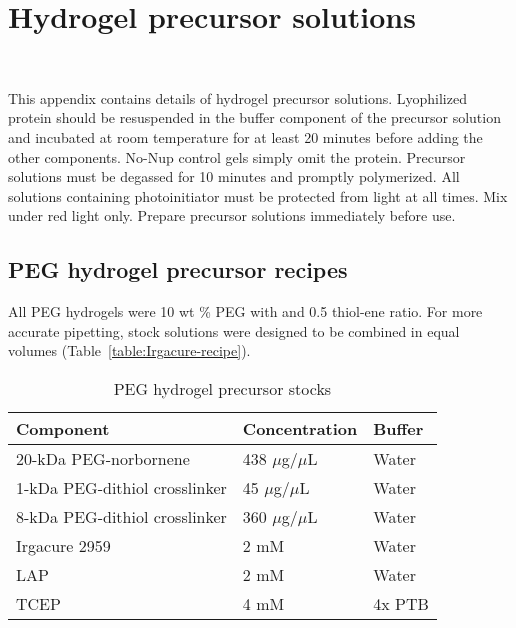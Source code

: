 \chapter{Hydrogel precursor solutions}~\label{appx:precursor-recipes}

This appendix contains details of hydrogel precursor solutions. Lyophilized protein should be resuspended in the buffer component of the precursor solution and incubated at room temperature for at least 20 minutes before adding the other components.  No-Nup control gels simply omit the protein.  Precursor solutions must be degassed for 10 minutes and promptly polymerized.  All solutions containing photoinitiator must be protected from light at all times.  Mix under red light only.  Prepare precursor solutions immediately before use.

\section{PEG hydrogel precursor recipes}

All PEG hydrogels were 10 wt \% PEG with and 0.5 thiol-ene ratio.  For more accurate pipetting, stock solutions were designed to be combined in equal volumes (Table~\ref{table:Irgacure-recipe}). 

\begin{table}[b!]
\centering
  \caption[PEG hydrogel precursor stocks.]{PEG hydrogel precursor stocks}
    \label{table:Irgacure}
    \begin{tabular}{p{5cm}p{4cm}p{5cm}}
      Component & Concentration & Buffer \\
\hline
20-kDa PEG-norbornene & 438 $\mu$g/$\mu$L & Water \\
1-kDa PEG-dithiol crosslinker & 45 $\mu$g/$\mu$L & Water \\
8-kDa PEG-dithiol crosslinker & 360 $\mu$g/$\mu$L & Water \\
Irgacure 2959 & 2 mM & Water \\
LAP & 2 mM & Water \\
TCEP & 4 mM & 4x PTB \\
\hline
    \end{tabular}
\end{table}

